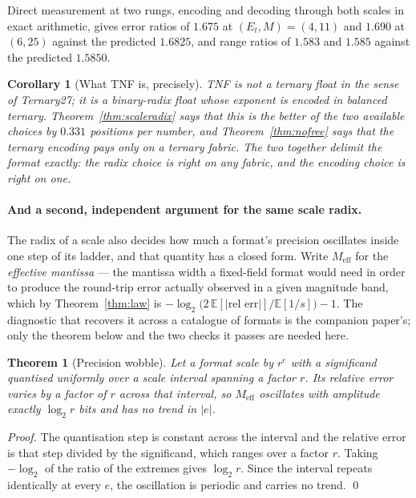 \documentclass[11pt]{article}
\newtheorem{theorem}{Theorem}
\newtheorem{corollary}{Corollary}
\theoremstyle{definition}
\begin{document}
Direct measurement at two rungs, encoding and decoding through both scales in
exact arithmetic, gives error ratios of $1.675$ at $(E_t,M) = (4,11)$ and $1.690$
at $(6,25)$ against the predicted $1.6825$, and range ratios of $1.583$ and
$1.585$ against the predicted $1.5850$.

\begin{corollary}[What TNF is, precisely]
TNF is not a ternary float in the sense of Ternary27; it is a binary-radix float
whose exponent is \emph{encoded} in balanced ternary. Theorem~\ref{thm:scaleradix}
says that this is the better of the two available choices by $0.331$ positions per
number, and Theorem~\ref{thm:nofree} says that the ternary encoding pays only on a
ternary fabric. The two together delimit the format exactly: the radix choice is
right on any fabric, and the encoding choice is right on one.
\end{corollary}


\paragraph{And a second, independent argument for the same scale radix.} The
radix of a scale also decides how much a format's precision oscillates inside
one step of its ladder, and that quantity has a closed form. Write
$M_{\mathrm{eff}}$ for the \emph{effective mantissa} --- the mantissa width a
fixed-field format would need in order to produce the round-trip error actually
observed in a given magnitude band, which by Theorem~\ref{thm:law} is
$-\log_2\bigl(2\,\mathbb{E}[|\text{rel err}|] / \mathbb{E}[1/s]\bigr) - 1$.
The diagnostic that recovers it across a catalogue of formats is the companion
paper's; only the theorem below and the two checks it passes are needed here.

\begin{theorem}[Precision wobble]
\label{thm:wobble}
Let a format scale by $r^{e}$ with a significand quantised uniformly over a
scale interval spanning a factor $r$. Its relative error varies by a factor of
$r$ across that interval, so $M_{\mathrm{eff}}$ oscillates with amplitude exactly
$\log_2 r$ bits and has no trend in $|e|$.
\end{theorem}

\begin{proof}
The quantisation step is constant across the interval and the relative error is
that step divided by the significand, which ranges over a factor $r$. Taking
$-\log_2$ of the ratio of the extremes gives $\log_2 r$. Since the interval
repeats identically at every $e$, the oscillation is periodic and carries no
trend. \qed
\end{proof}
\end{document}
